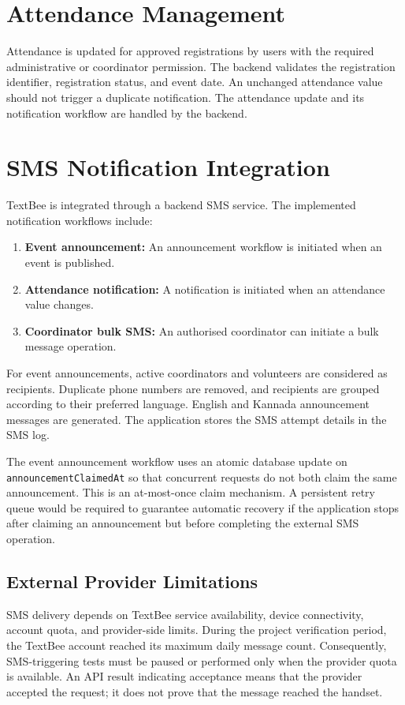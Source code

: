 \documentclass[12pt,a4paper,oneside]{report}
\begin{document}
\section{Attendance Management}
Attendance is updated for approved registrations by users with the required administrative or coordinator permission. The backend validates the registration identifier, registration status, and event date. An unchanged attendance value should not trigger a duplicate notification. The attendance update and its notification workflow are handled by the backend.

\section{SMS Notification Integration}
TextBee is integrated through a backend SMS service. The implemented notification workflows include:
\begin{enumerate}[label=\arabic*.]
  \item \textbf{Event announcement:} An announcement workflow is initiated when an event is published.
  \item \textbf{Attendance notification:} A notification is initiated when an attendance value changes.
  \item \textbf{Coordinator bulk SMS:} An authorised coordinator can initiate a bulk message operation.
\end{enumerate}

For event announcements, active coordinators and volunteers are considered as recipients. Duplicate phone numbers are removed, and recipients are grouped according to their preferred language. English and Kannada announcement messages are generated. The application stores the SMS attempt details in the SMS log.

The event announcement workflow uses an atomic database update on \texttt{announcementClaimedAt} so that concurrent requests do not both claim the same announcement. This is an at-most-once claim mechanism. A persistent retry queue would be required to guarantee automatic recovery if the application stops after claiming an announcement but before completing the external SMS operation.

\subsection{External Provider Limitations}
SMS delivery depends on TextBee service availability, device connectivity, account quota, and provider-side limits. During the project verification period, the TextBee account reached its maximum daily message count. Consequently, SMS-triggering tests must be paused or performed only when the provider quota is available. An API result indicating acceptance means that the provider accepted the request; it does not prove that the message reached the handset.
\end{document}
